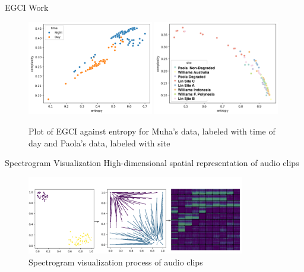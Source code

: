 \begin{frame}{EGCI Work}
    \begin{figure}
        \includegraphics[width=0.49\textwidth,keepaspectratio]{images/muha_egci.png}
        \includegraphics[width=0.49\textwidth,keepaspectratio]{images/paola_egci.png}

        \caption{Plot of EGCI against entropy for Muha's data, labeled with time of day  and Paola's data, labeled with site}
    \end{figure}
\end{frame}

\begin{frame}{Spectrogram Visualization}
    High-dimensional spatial representation of audio clips
    \begin{figure}
        \centering
        \includegraphics[height=0.85\textheight,width=0.85\textwidth,keepaspectratio]{images/spectrogram_visualization.png}
        \caption{Spectrogram visualization process of audio clips}
    \end{figure}
\end{frame}

